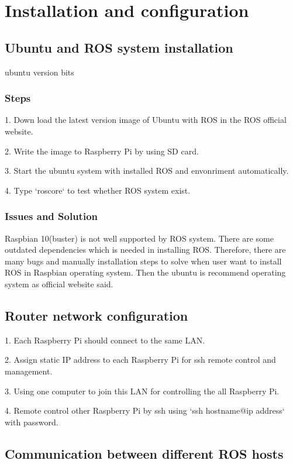 \documentclass{mproj}
\begin{document}
\chapter{Installation and configuration}

\section{Ubuntu and ROS system installation}

ubuntu version bits
\subsection{Steps}
1. Down load the latest version image of Ubuntu with ROS in the ROS official website.

2. Write the image to Raspberry Pi by using SD card.

3. Start the ubuntu system with installed ROS and envonriment automatically. 

4. Type `roscore` to test whether ROS system exist.
\subsection{Issues and Solution}
Raspbian 10(buster) is not well supported by ROS system. There are some outdated dependencies which is needed in installing ROS. Therefore, there are many bugs and manually installation steps to solve when user want to install ROS in Raspbian operating system. Then the ubuntu is recommend operating system as official website said.


\section{Router network configuration}
1. Each Raspberry Pi should connect to the same LAN.

2. Assign static IP address to each Raspberry Pi for ssh remote control and management.

3. Using one computer to join this LAN for controlling the all Raspberry Pi.

4. Remote control other Raspberry Pi by ssh using `ssh {hostname}@{ip address}` with password.


\section{Communication between different ROS hosts}
\end{document}
